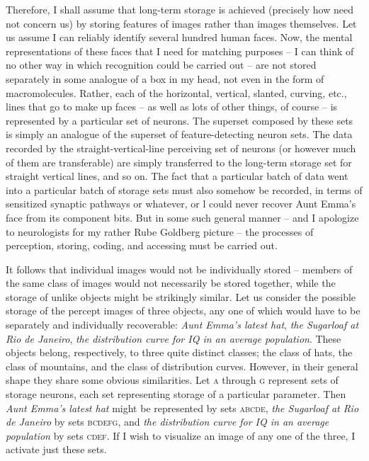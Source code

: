 Therefore, I shall assume that long-term storage is achieved (precisely how need not concern us) by storing features of images rather than images themselves. Let us assume I can reliably identify several hundred human faces. Now, the mental representations of these faces that I need for matching purposes -- I can think of no other way in which recognition could be carried out -- are not stored separately in some analogue of a box in my head, not even in the form of macromolecules. Rather, each of the horizontal, vertical, slanted, curving, etc., lines that go to make up faces -- as well as lots of other things, of course -- is represented by a particular set of neurons. The superset
composed by these sets is simply an analogue of the superset of feature-detecting neuron sets. The data recorded by the straight-vertical-line perceiving set of neurons (or however much of them are transferable) are simply transferred to the long-term storage set for straight vertical lines, and so on. The fact that a particular batch of data went into a particular batch of storage sets must also somehow be recorded, in terms of sensitized synaptic pathways or whatever, or l could never recover Aunt Emma's face from its component bits. But in some such general manner -- and I apologize to neurologists for my rather Rube Goldberg picture -- the processes of perception, storing, coding, and accessing must be carried out.

It follows that individual images would not be individually stored -- members of the same class of images would not necessarily be stored together, while the storage of unlike objects might be strikingly similar. Let us consider the possible storage of the percept images of three objects, any one of which would have to be separately and individually recoverable: \textit{Aunt Emma's latest hat}, \textit{the Sugarloaf at Rio de Janeiro}, \textit{the distribution curve for IQ in an average population}. These objects belong, respectively, to three quite distinct classes; the class of hats, the class of mountains, and the class of distribution curves. However, in their general shape they share some obvious similarities. Let \textsc{a} through \textsc{g} represent sets of storage neurons, each set representing storage of a particular parameter. Then \textit{Aunt Emma's latest hat} might be represented by sets \textsc{abcde}, \textit{the Sugarloaf at Rio de Janeiro} by sets \textsc{bcdefg}, and \textit{the distribution curve for IQ in an average population} by sets \textsc{cdef}. If I wish to visualize an image of any one of the three, I activate just these sets.

